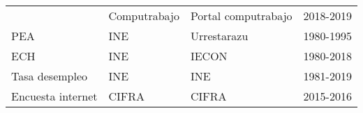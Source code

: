 \documentclass[12pt,twoside]{reedthesis}
\begin{document}
\begin{longtable}[]{@{}llll@{}}
\begin{minipage}[t]{0.26\columnwidth}
\end{minipage} & \begin{minipage}[t]{0.19\columnwidth}\raggedright
Computrabajo\strut
\end{minipage} & \begin{minipage}[t]{0.31\columnwidth}\raggedright
Portal computrabajo\strut
\end{minipage} & \begin{minipage}[t]{0.13\columnwidth}\raggedright
2018-2019\strut
\end{minipage}\tabularnewline
\begin{minipage}[t]{0.26\columnwidth}\raggedright
PEA\strut
\end{minipage} & \begin{minipage}[t]{0.19\columnwidth}\raggedright
INE\strut
\end{minipage} & \begin{minipage}[t]{0.31\columnwidth}\raggedright
Urrestarazu\strut
\end{minipage} & \begin{minipage}[t]{0.13\columnwidth}\raggedright
1980-1995\strut
\end{minipage}\tabularnewline
\begin{minipage}[t]{0.26\columnwidth}\raggedright
ECH\strut
\end{minipage} & \begin{minipage}[t]{0.19\columnwidth}\raggedright
INE\strut
\end{minipage} & \begin{minipage}[t]{0.31\columnwidth}\raggedright
IECON\strut
\end{minipage} & \begin{minipage}[t]{0.13\columnwidth}\raggedright
1980-2018\strut
\end{minipage}\tabularnewline
\begin{minipage}[t]{0.26\columnwidth}\raggedright
Tasa desempleo\strut
\end{minipage} & \begin{minipage}[t]{0.19\columnwidth}\raggedright
INE\strut
\end{minipage} & \begin{minipage}[t]{0.31\columnwidth}\raggedright
INE\strut
\end{minipage} & \begin{minipage}[t]{0.13\columnwidth}\raggedright
1981-2019\strut
\end{minipage}\tabularnewline
\begin{minipage}[t]{0.26\columnwidth}\raggedright
Encuesta internet\strut
\end{minipage} & \begin{minipage}[t]{0.19\columnwidth}\raggedright
CIFRA\strut
\end{minipage} & \begin{minipage}[t]{0.31\columnwidth}\raggedright
CIFRA\strut
\end{minipage} & \begin{minipage}[t]{0.13\columnwidth}\raggedright
2015-2016\strut
\end{minipage}\tabularnewline
\bottomrule
\end{longtable}
\end{document}
